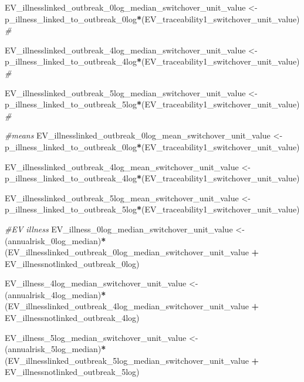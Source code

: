 \documentclass[
]{article}
\newenvironment{Shaded}{\begin{snugshade}}{\end{snugshade}}
\newcommand{\CommentTok}[1]{\textcolor[rgb]{0.56,0.35,0.01}{\textit{#1}}}
\newcommand{\NormalTok}[1]{#1}
\newcommand{\OtherTok}[1]{\textcolor[rgb]{0.56,0.35,0.01}{#1}}
\newcommand{\SpecialCharTok}[1]{\textcolor[rgb]{0.81,0.36,0.00}{\textbf{#1}}}
\begin{document}
\begin{Shaded}
\begin{Highlighting}[]
\NormalTok{EV\_illnesslinked\_outbreak\_0log\_median\_switchover\_unit\_value }\OtherTok{\textless{}{-}}\NormalTok{ p\_illness\_linked\_to\_outbreak\_0log}\SpecialCharTok{*}\NormalTok{(EV\_traceability1\_switchover\_unit\_value) }\CommentTok{\#}

\NormalTok{EV\_illnesslinked\_outbreak\_4log\_median\_switchover\_unit\_value }\OtherTok{\textless{}{-}}\NormalTok{ p\_illness\_linked\_to\_outbreak\_4log}\SpecialCharTok{*}\NormalTok{(EV\_traceability1\_switchover\_unit\_value) }\CommentTok{\#}

\NormalTok{EV\_illnesslinked\_outbreak\_5log\_median\_switchover\_unit\_value }\OtherTok{\textless{}{-}}\NormalTok{ p\_illness\_linked\_to\_outbreak\_5log}\SpecialCharTok{*}\NormalTok{(EV\_traceability1\_switchover\_unit\_value) }\CommentTok{\#}


\CommentTok{\#means}
\NormalTok{EV\_illnesslinked\_outbreak\_0log\_mean\_switchover\_unit\_value }\OtherTok{\textless{}{-}}\NormalTok{ p\_illness\_linked\_to\_outbreak\_0log}\SpecialCharTok{*}\NormalTok{(EV\_traceability1\_switchover\_unit\_value) }

\NormalTok{EV\_illnesslinked\_outbreak\_4log\_mean\_switchover\_unit\_value }\OtherTok{\textless{}{-}}\NormalTok{ p\_illness\_linked\_to\_outbreak\_4log}\SpecialCharTok{*}\NormalTok{(EV\_traceability1\_switchover\_unit\_value) }

\NormalTok{EV\_illnesslinked\_outbreak\_5log\_mean\_switchover\_unit\_value }\OtherTok{\textless{}{-}}\NormalTok{ p\_illness\_linked\_to\_outbreak\_5log}\SpecialCharTok{*}\NormalTok{(EV\_traceability1\_switchover\_unit\_value) }


\CommentTok{\#EV illness}
\NormalTok{EV\_illness\_0log\_median\_switchover\_unit\_value }\OtherTok{\textless{}{-}}\NormalTok{ (annualrisk\_0log\_median)}\SpecialCharTok{*}\NormalTok{(EV\_illnesslinked\_outbreak\_0log\_median\_switchover\_unit\_value }\SpecialCharTok{+}\NormalTok{ EV\_illnessnotlinked\_outbreak\_0log)}

\NormalTok{EV\_illness\_4log\_median\_switchover\_unit\_value }\OtherTok{\textless{}{-}}\NormalTok{ (annualrisk\_4log\_median)}\SpecialCharTok{*}\NormalTok{(EV\_illnesslinked\_outbreak\_4log\_median\_switchover\_unit\_value }\SpecialCharTok{+}\NormalTok{ EV\_illnessnotlinked\_outbreak\_4log)}

\NormalTok{EV\_illness\_5log\_median\_switchover\_unit\_value }\OtherTok{\textless{}{-}}\NormalTok{ (annualrisk\_5log\_median)}\SpecialCharTok{*}\NormalTok{(EV\_illnesslinked\_outbreak\_5log\_median\_switchover\_unit\_value }\SpecialCharTok{+}\NormalTok{ EV\_illnessnotlinked\_outbreak\_5log)}



\end{Highlighting}
\end{Shaded}
\end{document}

